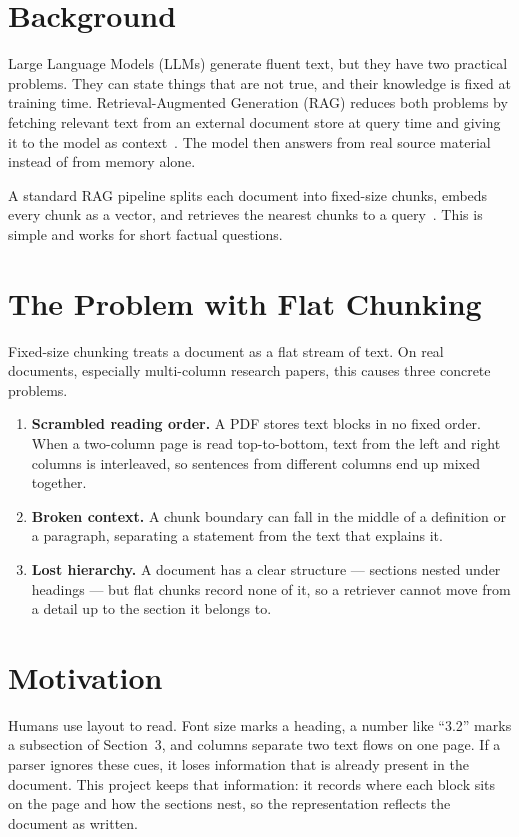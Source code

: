 \documentclass[12pt,a4paper,twoside,openright]{report}
\begin{document}
\section{Background}
Large Language Models (LLMs) generate fluent text, but they have two practical
problems. They can state things that are not true, and their knowledge is fixed at
training time. Retrieval-Augmented Generation (RAG) reduces both problems by fetching
relevant text from an external document store at query time and giving it to the model
as context~\cite{lewis2020rag,guu2020realm}. The model then answers from real source
material instead of from memory alone.

A standard RAG pipeline splits each document into fixed-size chunks, embeds every chunk
as a vector, and retrieves the nearest chunks to a query~\cite{borgeaud2022retro,izacard2023atlas}.
This is simple and works for short factual questions.

\section{The Problem with Flat Chunking}
Fixed-size chunking treats a document as a flat stream of text. On real documents,
especially multi-column research papers, this causes three concrete problems.
\begin{enumerate}
  \item \textbf{Scrambled reading order.} A PDF stores text blocks in no fixed order.
  When a two-column page is read top-to-bottom, text from the left and right columns is
  interleaved, so sentences from different columns end up mixed together.
  \item \textbf{Broken context.} A chunk boundary can fall in the middle of a definition
  or a paragraph, separating a statement from the text that explains it.
  \item \textbf{Lost hierarchy.} A document has a clear structure --- sections nested
  under headings --- but flat chunks record none of it, so a retriever cannot move from a
  detail up to the section it belongs to.
\end{enumerate}

\section{Motivation}
Humans use layout to read. Font size marks a heading, a number like ``3.2'' marks a
subsection of Section~3, and columns separate two text flows on one page. If a parser
ignores these cues, it loses information that is already present in the document. This
project keeps that information: it records where each block sits on the page and how the
sections nest, so the representation reflects the document as written.
\end{document}
